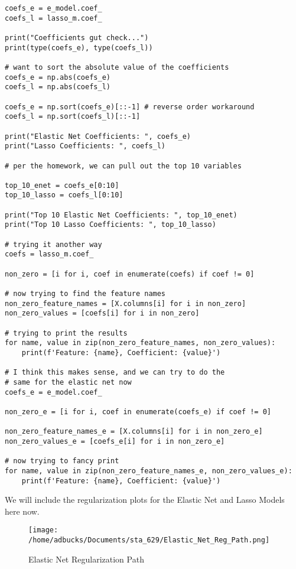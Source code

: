 \documentclass[12pt, letterpaper]{article}
\begin{document}
\begin{verbatim}
coefs_e = e_model.coef_ 
coefs_l = lasso_m.coef_

print("Coefficients gut check...")
print(type(coefs_e), type(coefs_l))

# want to sort the absolute value of the coefficients 
coefs_e = np.abs(coefs_e) 
coefs_l = np.abs(coefs_l) 

coefs_e = np.sort(coefs_e)[::-1] # reverse order workaround 
coefs_l = np.sort(coefs_l)[::-1] 

print("Elastic Net Coefficients: ", coefs_e) 
print("Lasso Coefficients: ", coefs_l) 

# per the homework, we can pull out the top 10 variables 

top_10_enet = coefs_e[0:10] 
top_10_lasso = coefs_l[0:10] 

print("Top 10 Elastic Net Coefficients: ", top_10_enet) 
print("Top 10 Lasso Coefficients: ", top_10_lasso) 

# trying it another way 
coefs = lasso_m.coef_  

non_zero = [i for i, coef in enumerate(coefs) if coef != 0]

# now trying to find the feature names 
non_zero_feature_names = [X.columns[i] for i in non_zero]
non_zero_values = [coefs[i] for i in non_zero]

# trying to print the results 
for name, value in zip(non_zero_feature_names, non_zero_values):
    print(f'Feature: {name}, Coefficient: {value}')

# I think this makes sense, and we can try to do the
# same for the elastic net now 
coefs_e = e_model.coef_

non_zero_e = [i for i, coef in enumerate(coefs_e) if coef != 0]

non_zero_feature_names_e = [X.columns[i] for i in non_zero_e]
non_zero_values_e = [coefs_e[i] for i in non_zero_e]

# now trying to fancy print 
for name, value in zip(non_zero_feature_names_e, non_zero_values_e):
    print(f'Feature: {name}, Coefficient: {value}')

\end{verbatim}

We will include the regularization plots for the Elastic Net and Lasso Models here now. 

\begin{figure} 
\texttt{[image: /home/adbucks/Documents/sta\_629/Elastic\_Net\_Reg\_Path.png]} 
\caption{Elastic Net Regularization Path} 
\end{figure} 
\end{document}

